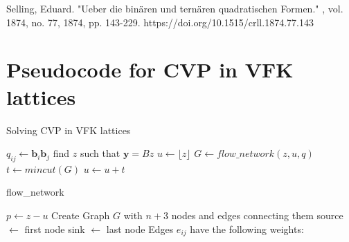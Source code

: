 \documentclass{amsart}
\numberwithin{equation}{section}
\def\L{\mathcal{L}}
\begin{document}
{\begin{thebibliography}{9}
 Selling, Eduard. "Ueber die binären und ternären quadratischen Formen." , vol. 1874, no. 77, 1874, pp. 143-229. https://doi.org/10.1515/crll.1874.77.143

\end{thebibliography}

\appendix
\newpage
\section{Pseudocode for CVP in VFK lattices}\label{appendixA}

{}

\begin{algorithm}[H]
\caption{Solving CVP in VFK lattices}\label{alg:MAINALGO}

\Output{A closest vector $\textbf{v} \in \L$ of $\textbf{y}$}

$q_{ij} \gets \textbf{b}_i \textbf{b}_j$ 
find $z$ such that $\textbf{y} = Bz$ 
$u \gets \lfloor z \rfloor$\;
 {
  $G\gets flow\_network(z,u, q)$ 
  $t\gets mincut(G)$ 
  $u\gets u+t$\;
}
\end{algorithm}

\begin{algorithm}[H]
\caption{flow\_network}\label{alg:GRAPH}
$p \gets z - u$\;
Create Graph $G$ with $n+3$ nodes and edges connecting them\;
source $\gets$ first node\;
sink $\gets$ last node\;
Edges $e_{ij}$ have the following weights: \\
\end{algorithm}

}
\end{document}
